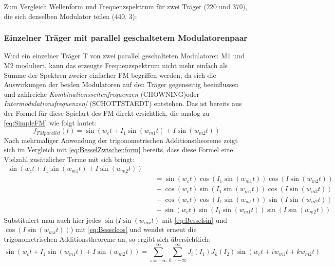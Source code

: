 Zum Vergleich Wellenform und Frequenzspektrum für zwei Träger (220 und 370), die sich denselben Modulator teilen (440, 3):

\subsubsection{Einzelner Träger mit parallel geschaltetem Modulatorenpaar}

Wird ein einzelner Träger T von zwei parallel geschalteten Modulatoren M1 und M2 moduliert, kann das erzeugte Frequenzspektrum nicht mehr einfach als Summe der Spektren zweier einfacher FM begriffen werden, da sich die Auswirkungen der beiden Modulatoren auf den Träger gegenseitig beeinflussen und zahlreiche \textit{Kombinationsseitenfrequenzen} (CHOWNING)oder \textit{Intermodulationsfrequenzen]} (SCHOTTSTAEDT) entstehen. Das ist bereits aus der Formel für diese Spielart des FM direkt ersichtlich, die analog zu \ref{eq:SimpleFM} wie folgt lautet:
\begin{equation}
f_{FMparallel}(t) = \sin(w_ct + I_1\sin(w_{m1}t) + I\sin(w_{m2}t))
\end{equation}
Nach mehrmaliger Anwendung der trigonometrischen Additionstheoreme zeigt sich im Vergleich mit \ref{eq:BesselZwischenform} bereits, dass diese Formel eine Vielzahl zusätzlicher Terme mit sich bringt:
\begin{equation}
\begin{split}
\sin(w_ct + I_1\sin(w_{m1}t) + I\sin(w_{m2}t)) \\ &\quad = \sin(w_ct)\cos(I_1\sin(w_{m1}t))\cos(I\sin(w_{m2}t)) \\ &\quad + \cos(w_ct)\sin(I_1\sin(w_{m1}t))\cos(I\sin(w_{m2}t)) \\ &\quad +\cos(w_ct)\cos(I_1\sin(w_{m1}t))\sin(I\sin(w_{m2}t)) \\ &\quad -\sin(w_ct)\sin(I_1\sin(w_{m1}t))\sin(I\sin(w_{m2}t))
\end{split}
\end{equation}
Substituiert man auch hier jedes \begin{math} \sin(I\sin(w_{mx}t) \end{math} mit \ref{eq:Besselsin} und \begin{math} \cos(I\sin(w_{mx}t)) \end{math}) mit \ref{eq:Besselcos} und wendet erneut die trigonometrischen Additionstheoreme an, so ergibt sich übersichtlich:
\begin{equation}\label{eq:ParallelKompakt}
\sin(w_ct + I_1\sin(w_{m1}t) + I\sin(w_{m2}t)) = \sum_{i=-\infty}^{\infty}\sum_{k=-\infty}^{\infty}J_i(I_1)J_k(I_2)\sin(w_ct + iw_{m1}t + kw_{m2}t)
\end{equation}
